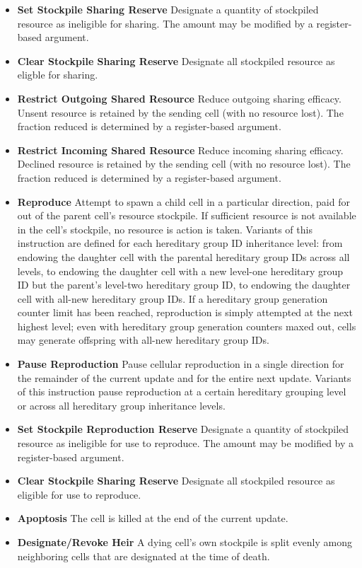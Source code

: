 \begin{itemize}
\item \textbf{Set Stockpile Sharing Reserve}
Designate a quantity of stockpiled resource as ineligible for sharing.
The amount may be modified by a register-based argument.
\item \textbf{Clear Stockpile Sharing Reserve}
Designate all stockpiled resource as eligble for sharing.
\item \textbf{Restrict Outgoing Shared Resource}
Reduce outgoing sharing efficacy.
Unsent resource is retained by the sending cell (with no resource lost).
The fraction reduced is determined by a register-based argument.
\item \textbf{Restrict Incoming Shared Resource}
Reduce incoming sharing efficacy.
Declined resource is retained by the sending cell (with no resource lost).
The fraction reduced is determined by a register-based argument.
\item \textbf{Reproduce}
Attempt to spawn a child cell in a particular direction, paid for out of the parent cell's resource stockpile.
If sufficient resource is not available in the cell's stockpile, no resource is action is taken.
Variants of this instruction are defined for each hereditary group ID inheritance level: from endowing the daughter cell with the parental hereditary group IDs across all levels, to endowing the daughter cell with a new level-one hereditary group ID but the parent's level-two hereditary group ID, to endowing the daughter cell with all-new hereditary group IDs.
If a hereditary group generation counter limit has been reached, reproduction is simply attempted at the next highest level; even with hereditary group generation counters maxed out, cells may generate offspring with all-new hereditary group IDs.
\item \textbf{Pause Reproduction}
Pause cellular reproduction in a single direction for the remainder of the current update and for the entire next update.
Variants of this instruction pause reproduction at a certain hereditary grouping level or across all hereditary group inheritance levels.
\item \textbf{Set Stockpile Reproduction Reserve}
Designate a quantity of stockpiled resource as ineligible for use to reproduce.
The amount may be modified by a register-based argument.
\item \textbf{Clear Stockpile Sharing Reserve}
Designate all stockpiled resource as eligible for use to reproduce.
\item \textbf{Apoptosis}
The cell is killed at the end of the current update.
\item \textbf{Designate/Revoke Heir} A dying cell's own stockpile is split evenly among neighboring cells that are designated at the time of death.

\end{itemize}
